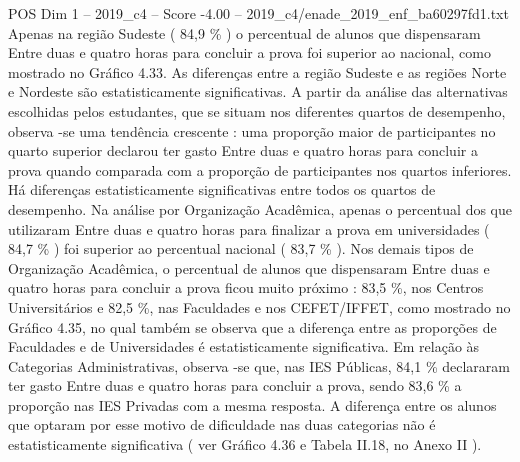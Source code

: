 \begin{textsample}{POS Dim 1 – 2019\_c4 – Score -4.00 – 2019\_c4/enade\_2019\_enf\_ba60297fd1.txt}
Apenas na região Sudeste ( 84,9 \% ) o percentual de alunos que dispensaram Entre duas e quatro horas para concluir a prova foi superior ao nacional, como mostrado no Gráfico 4.33.
As diferenças entre a região Sudeste e as regiões Norte e Nordeste são estatisticamente significativas.
A partir da análise das alternativas escolhidas pelos estudantes, que se situam nos diferentes quartos de desempenho, observa -se uma tendência crescente : uma proporção maior de participantes no quarto superior declarou ter gasto Entre duas e quatro horas para concluir a prova quando comparada com a proporção de participantes nos quartos inferiores.
Há diferenças estatisticamente significativas entre todos os quartos de desempenho.
Na análise por Organização Acadêmica, apenas o percentual dos que utilizaram Entre duas e quatro horas para finalizar a prova em universidades ( 84,7 \% ) foi superior ao percentual nacional ( 83,7 \% ).
Nos demais tipos de Organização Acadêmica, o percentual de alunos que dispensaram Entre duas e quatro horas para concluir a prova ficou muito próximo : 83,5 \%, nos Centros Universitários e 82,5 \%, nas Faculdades e nos CEFET/IFFET, como mostrado no Gráfico 4.35, no qual também se observa que a diferença entre as proporções de Faculdades e de Universidades é estatisticamente significativa.
Em relação às Categorias Administrativas, observa -se que, nas IES Públicas, 84,1 \% declararam ter gasto Entre duas e quatro horas para concluir a prova, sendo 83,6 \% a proporção nas IES Privadas com a mesma resposta.
A diferença entre os alunos que optaram por esse motivo de dificuldade nas duas categorias não é estatisticamente significativa ( ver Gráfico 4.36 e Tabela II.18, no Anexo II ).

\end{textsample}
